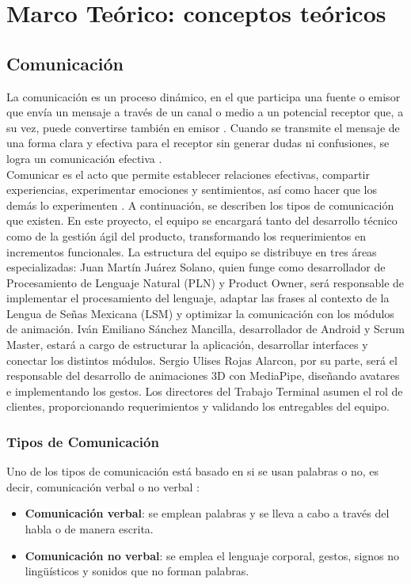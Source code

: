\chapter{Marco Teórico: conceptos teóricos}
\section{Comunicación}
La comunicación es un proceso dinámico, en el que participa una fuente o emisor que envía un mensaje a través de un canal o medio a un potencial receptor que, a su vez, puede convertirse también en emisor \cite{ref20}. Cuando se transmite el mensaje de una forma clara y efectiva para el receptor sin generar dudas ni confusiones, se logra un comunicación efectiva \cite{ref21}.\\

Comunicar es el acto que permite establecer relaciones efectivas, compartir experiencias, experimentar emociones y sentimientos, así como hacer que los demás lo experimenten \cite{ref22}. A continuación, se describen los tipos de comunicación que existen.
En este proyecto, el equipo se encargará tanto del desarrollo técnico como de la gestión ágil del producto, transformando los requerimientos en incrementos funcionales. La estructura del equipo se distribuye en tres áreas especializadas: Juan Martín Juárez Solano, quien funge como desarrollador de Procesamiento de Lenguaje Natural (PLN) y Product Owner, será responsable de implementar el procesamiento del lenguaje, adaptar las frases al contexto de la Lengua de Señas Mexicana (LSM) y optimizar la comunicación con los módulos de animación. Iván Emiliano Sánchez Mancilla, desarrollador de Android y Scrum Master, estará a cargo de estructurar la aplicación, desarrollar interfaces y conectar los distintos módulos. Sergio Ulises Rojas Alarcon, por su parte, será el responsable del desarrollo de animaciones 3D con MediaPipe, diseñando avatares e implementando los gestos. Los directores del Trabajo Terminal asumen el rol de clientes, proporcionando requerimientos y validando los entregables del equipo.

\newpage
\subsection{Tipos de Comunicación}
Uno de los tipos de comunicación está basado en si se usan palabras o no, es decir, comunicación verbal o no verbal \cite{ref23}:

\begin{itemize}
    \item \textbf{Comunicación verbal}: se emplean palabras y se lleva a cabo a través del habla o de manera escrita.
    \item \textbf{Comunicación no verbal}: se emplea el lenguaje corporal, gestos, signos no lingüísticos y sonidos que no forman palabras.
\end{itemize}

